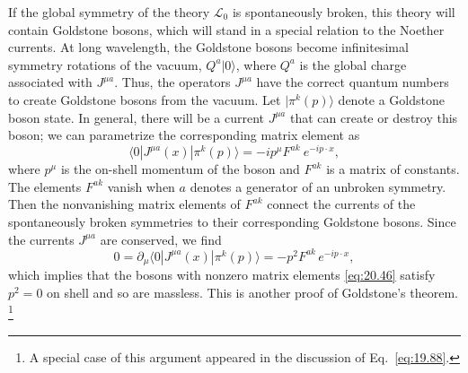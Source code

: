 If the global symmetry of the theory $\mathcal{L}_0$ is spontaneously broken,
this theory will contain Goldstone bosons, which will stand in a special
relation to the Noether currents.  At long wavelength, the Goldstone bosons
become infinitesimal symmetry rotations of the vacuum, $Q^a|0\rangle$, where
$Q^a$ is the global charge associated with $J^{\mu a}$.  Thus, the operators
$J^{\mu a}$ have the correct quantum numbers to create Goldstone bosons from
the vacuum.  Let $|\pi^k(p)\rangle$ denote a Goldstone boson state.  In
general, there will be a current $J^{\mu a}$ that can create or destroy this
boson; we can parametrize the corresponding matrix element as
\begin{equation}
  \langle 0|J^{\mu a}(x)|\pi^k(p)\rangle = -ip^\mu F^{ak}\ e^{-ip\cdot x} ,
  \label{eq:20.46}
\end{equation}
where $p^\mu$ is the on-shell momentum of the boson and $F^{ak}$ is a matrix
of constants.  The elements $F^{ak}$ vanish when $a$ denotes a generator of
an unbroken symmetry.  Then the nonvanishing matrix elements of $F^{ak}$
connect the currents of the spontaneously broken symmetries to their
corresponding Goldstone bosons.  Since the currents $J^{\mu a}$ are conserved,
we find
\begin{equation}
  0 = \partial_\mu\langle 0|J^{\mu a}(x)|\pi^k(p)\rangle
  = -p^2 F^{ak}\,e^{-ip\cdot x} ,
  \label{eq:20.47}
\end{equation}
which implies that the bosons with nonzero matrix elements \eqref{eq:20.46}
satisfy $p^2 = 0$ on shell and so are massless.  This is another proof of
Goldstone's theorem.%
\footnote{A special case of this argument appeared in the discussion of
Eq.~\eqref{eq:19.88}.}

